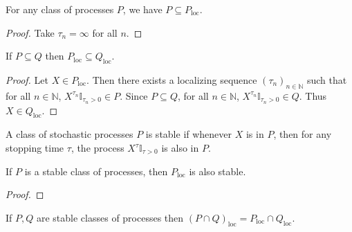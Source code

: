\begin{lemma}\label{lem:implies_locally}
  \leanok
For any class of processes $P$, we have $P \subseteq P_{\mathrm{loc}}$.
\end{lemma}

\begin{proof}\leanok
Take $\tau_n = \infty$ for all $n$.
\end{proof}


\begin{lemma}\label{lem:locally_mono}
  \leanok
If $P \subseteq Q$ then $P_{\mathrm{loc}} \subseteq Q_{\mathrm{loc}}$.
\end{lemma}

\begin{proof}\leanok
Let $X \in P_{\mathrm{loc}}$.
Then there exists a localizing sequence $(\tau_n)_{n \in \mathbb{N}}$ such that for all $n \in \mathbb{N}$, $X^{\tau_n}\mathbb{I}_{\tau_n > 0} \in P$.
Since $P \subseteq Q$, for all $n \in \mathbb{N}$, $X^{\tau_n}\mathbb{I}_{\tau_n > 0} \in Q$.
Thus $X \in Q_{\mathrm{loc}}$.
\end{proof}


\begin{definition}\label{def:stable}
  \leanok
A class of stochastic processes $P$ is stable if whenever $X$ is in $P$, then for any stopping time $\tau$, the process $X^{\tau}\mathbb{I}_{\tau > 0}$ is also in $P$.
\end{definition}


\begin{lemma}\label{lem:isStable_locally}
  \leanok
If $P$ is a stable class of processes, then $P_{\mathrm{loc}}$ is also stable.
\end{lemma}

\begin{proof}\leanok

\end{proof}


\begin{lemma}\label{lem:locally_inter}
  \leanok
If $P, Q$ are stable classes of processes then $(P\cap Q)_{\mathrm{loc}} = P_{\mathrm{loc}}\cap Q_{\mathrm{loc}}$.
\end{lemma}

